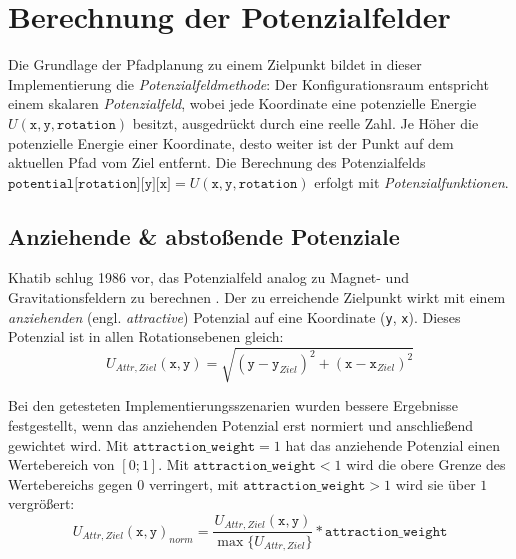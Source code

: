 \chapter{Berechnung der Potenzialfelder}

Die Grundlage der Pfadplanung zu einem Zielpunkt bildet in dieser Implementierung die \textit{Potenzialfeldmethode}:
Der Konfigurationsraum entspricht einem skalaren \textit{Potenzialfeld}, wobei jede Koordinate eine potenzielle Energie $U(\texttt{x}, \texttt{y}, \texttt{rotation})$ besitzt, ausgedrückt durch eine reelle Zahl.
Je Höher die potenzielle Energie einer Koordinate, desto weiter ist der Punkt auf dem aktuellen Pfad vom Ziel entfernt.
Die Berechnung des Potenzialfelds $\texttt{potential[rotation][y][x]} = U(\texttt{x}, \texttt{y}, \texttt{rotation})$ erfolgt mit \textit{Potenzialfunktionen}. \cite{yujiang.2017}

\vspace*{0.2cm}
\section{Anziehende \& abstoßende Potenziale} \label{sec:attr-repul-pot}

Khatib schlug 1986 vor, das Potenzialfeld analog zu Magnet- und Gravitationsfeldern zu berechnen \cite{khatib.1985}. Der zu erreichende Zielpunkt wirkt mit einem \textit{anziehenden} (engl. \textit{attractive}) Potenzial auf eine Koordinate (\texttt{y}, \texttt{x}). Dieses Potenzial ist in allen Rotationsebenen gleich:
\vspace*{0.25cm}
\begin{equation*}
U_{Attr, Ziel}(\texttt{x}, \texttt{y}) = \sqrt{(\texttt{y} - \texttt{y}_{Ziel})^2 + (\texttt{x} - \texttt{x}_{Ziel})^2}
\end{equation*}

Bei den getesteten Implementierungsszenarien wurden bessere Ergebnisse festgestellt, wenn das anziehenden Potenzial erst normiert und anschließend gewichtet wird. Mit $\texttt{attraction\_weight} = 1$ hat das anziehende Potenzial einen Wertebereich von $[0;1]$. Mit  $\texttt{attraction\_weight} < 1$ wird die obere Grenze des Wertebereichs gegen $0$ verringert, mit $\texttt{attraction\_weight} > 1$ wird sie über $1$ vergrößert:
\vspace*{0.3cm}
\begin{equation*}
U_{Attr, Ziel}(\texttt{x}, \texttt{y})_{norm} = \frac{U_{Attr, Ziel}(\texttt{x}, \texttt{y})}{\max \{ U_{Attr, Ziel}\}} * \texttt{attraction\_weight} 
\end{equation*}

